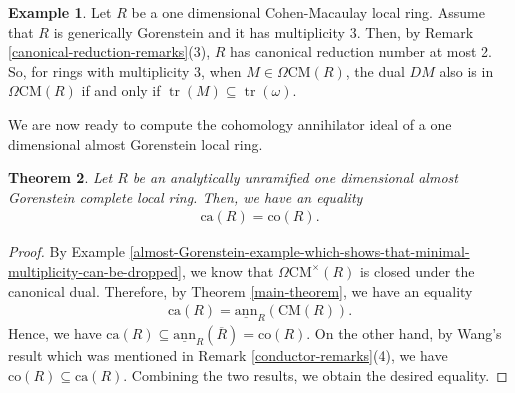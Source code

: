 \documentclass[12pt]{amsart}
\newcommand{\sann}{\underline{\mathrm{ann}}}
\newcommand\ca{\mathrm{ca}}
\newcommand\co{\mathrm{co}}
\newcommand{\CM}{\mathrm{CM}}
\newtheorem{theorem}{Theorem}[section]
\theoremstyle{definition}
\newtheorem{example}[theorem]{Example}
\numberwithin{equation}{theorem}
\DeclareMathOperator{\tr}{\mathrm{tr}}
\begin{document}
\begin{example}\label{multiplicity-3-example}
    Let $R$ be a one dimensional Cohen-Macaulay local ring. Assume that $R$ is generically Gorenstein and it has multiplicity $3$. Then, by Remark \ref{canonical-reduction-remarks}(3), $R$ has canonical reduction number at most 2. So, for rings with multiplicity 3, when $M \in \Omega \CM(R)$, the dual $DM$ also is in $\Omega \CM(R)$ if and only if $\tr(M) \subseteq \tr(\omega)$. 
\end{example}
We are now ready to compute the cohomology annihilator ideal of a one dimensional almost Gorenstein local ring.
\begin{theorem}\label{theorem-cohomology-annihilator-of-an-almost-Gorenstein-ring}
    Let $R$ be an analytically unramified one dimensional almost Gorenstein complete local ring. Then, we have an equality 
    \begin{align*}
    \ca(R) = \co(R).
    \end{align*}
\end{theorem}
\begin{proof}
    By Example \ref{almost-Gorenstein-example-which-shows-that-minimal-multiplicity-can-be-dropped}, we know that $\Omega \CM^\times(R)$ is closed under the canonical dual. Therefore, by Theorem \ref{main-theorem}, we have an equality 
    \begin{align*}
    \ca(R) = \sann_R(\CM(R)).
    \end{align*}
    Hence, we have $\ca(R) \subseteq \sann_R(\overline{R}) = \co(R)$. On the other hand, by Wang's result which was mentioned in Remark \ref{conductor-remarks}(4), we have $\co(R) \subseteq \ca(R)$. Combining the two results, we obtain the desired equality.  
\end{proof}




\end{document}
